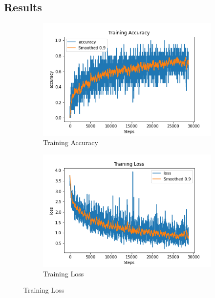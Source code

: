 \subsection{Results}
\begin{figure}[H]
     \centering
     \begin{subfigure}[b]{0.3\textwidth}
         \centering
         \includegraphics[width=\textwidth]{./figure/results/look_around/training/accuracy.png}
         \caption{Training Accuracy}
         \label{fig:la_t_accuracy}
     \end{subfigure}
     \hfill
     \begin{subfigure}[b]{0.3\textwidth}
         \centering
         \includegraphics[width=\textwidth]{./figure/results/look_around/training/loss.png}
         \caption{Training Loss}
         \label{fig:la_t_loss}
     \end{subfigure}
     \hfill

\end{figure}
